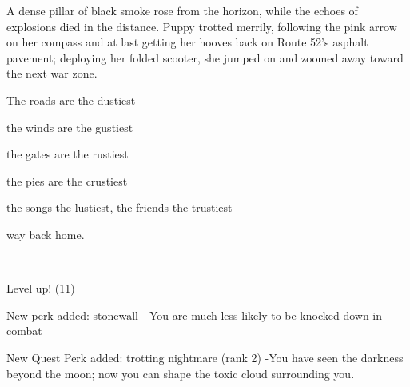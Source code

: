 A dense pillar of black smoke rose from the horizon, while the echoes of explosions died in the distance. Puppy trotted merrily, following the pink arrow on her compass and at last getting her hooves back on Route 52's asphalt pavement; deploying her folded scooter, she jumped on and zoomed away toward the next war zone.


\begin{song}
    The roads are the dustiest

    the winds are the gustiest

    the gates are the rustiest

    the pies are the crustiest

    the songs the lustiest, the friends the trustiest

    way back home.
\end{song}

\clearpage

~\vfill

\begin{engnote}
    Level up! (11)
    
    New perk added: stonewall - You are much less likely to be knocked down in combat
    
    New Quest Perk added: trotting nightmare (rank 2) -You have seen the darkness beyond the moon; now you can shape the toxic cloud surrounding you.
\end{engnote}


